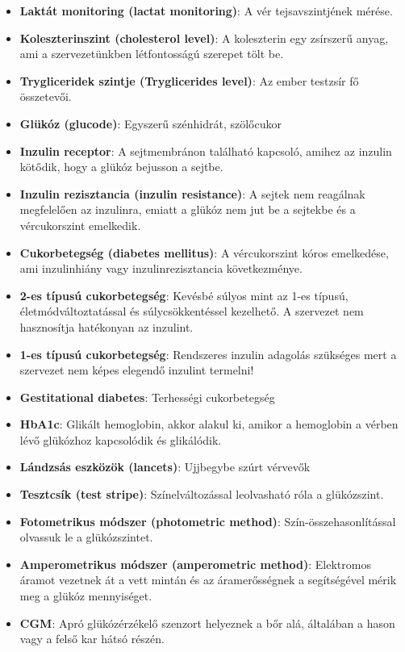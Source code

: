 \begin{itemize}
    \item \textbf{Laktát monitoring (lactat monitoring)}: A vér tejsavszintjének mérése.
    \item \textbf{Koleszterinszint (cholesterol level)}: A koleszterin egy zsírszerű anyag, ami a szervezetünkben létfontosságú szerepet tölt be.
    \item \textbf{Trygliceridek szintje (Tryglicerides level)}: Az ember testzsír fő összetevői.
    \item \textbf{Glükóz (glucode)}: Egyszerű szénhidrát, szölőcukor
    \item \textbf{Inzulin receptor}: A sejtmembránon található kapcsoló, amihez az inzulin kötődik, hogy a glükóz bejusson a sejtbe.
    \item \textbf{Inzulin rezisztancia (inzulin resistance)}: A sejtek nem reagálnak megfelelően az inzulinra, emiatt a glükóz nem jut be a sejtekbe és a vércukorszint emelkedik.
    \item \textbf{Cukorbetegség (diabetes mellitus)}: A vércukorszint kóros emelkedése, ami inzulinhiány vagy inzulinrezisztancia következménye.
    \item \textbf{2-es típusú cukorbetegség}: Kevésbé súlyos mint az 1-es típusú, életmódváltoztatással és súlycsökkentéssel kezelhető. A szervezet nem hasznosítja hatékonyan az inzulint.
    \item \textbf{1-es típusú cukorbetegség}: Rendszeres inzulin adagolás szükséges mert a szervezet nem képes elegendő inzulint termelni!
    \item \textbf{Gestitational diabetes}: Terhességi cukorbetegség
    \item \textbf{HbA1c}: Glikált hemoglobin, akkor alakul ki, amikor a hemoglobin a vérben lévő glükózhoz kapcsolódik és glikálódik.
    \item \textbf{Lándzsás eszközök (lancets)}: Ujjbegybe szúrt vérvevők
    \item \textbf{Tesztcsík (test stripe)}: Színelváltozással leolvasható róla a glükózszint.
    \item \textbf{Fotometrikus módszer (photometric method)}: Szín-összehasonlítással olvassuk le a glükózszintet.
    \item \textbf{Amperometrikus módszer (amperometric method)}: Elektromos áramot vezetnek át a vett mintán és az áramerősségnek a segítségével mérik meg a glükóz mennyiséget.
    \item \textbf{CGM}: Apró glükózérzékelő szenzort helyeznek a bőr alá, általában a hason vagy a felső kar hátsó részén.

\end{itemize}
